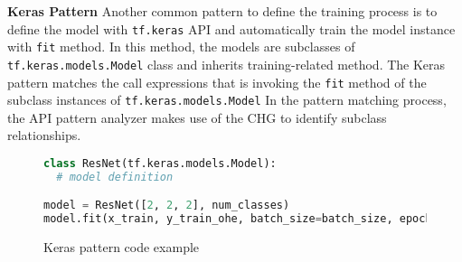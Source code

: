 \textbf{Keras Pattern}
Another common pattern to define the training process is to define
the model with {\tt tf.keras} API and automatically train the model
instance with {\tt fit} method.
In this method, the models are subclasses of {\tt tf.keras.models.Model} class
and inherits training-related method.
The Keras pattern matches the call expressions that is invoking the {\tt fit}
method of the subclass instances of {\tt tf.keras.models.Model}
In the pattern matching process, the API pattern analyzer
makes use of the CHG to identify subclass relationships. 

\begin{figure}[!ht]
  \begin{lstlisting}[language=Python]
class ResNet(tf.keras.models.Model):
  # model definition

model = ResNet([2, 2, 2], num_classes)
model.fit(x_train, y_train_ohe, batch_size=batch_size, epochs=epochs,
  \end{lstlisting}
  \caption{Keras pattern code example}
\end{figure}

